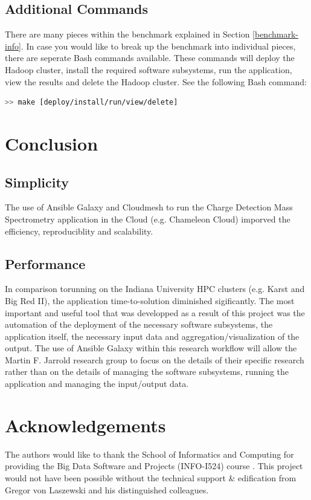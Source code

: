 \documentclass[9pt,twocolumn,twoside]{../../styles/osajnl}
\begin{document}
\subsection{Additional Commands} \label{other}
There are many pieces within the benchmark explained in Section
\ref{benchmark-info}. In case you would like to break up the benchmark
into individual pieces, there are seperate Bash commands
available. These commands will deploy the Hadoop cluster, install the
required software subsystems, run the application, view the results
and delete the Hadoop cluster.
\noindent See the following Bash command:
\begin{lstlisting}[language=bash]
  >> make [deploy/install/run/view/delete]
\end{lstlisting}

\section{Conclusion} \label{conclusion}
\subsection{Simplicity} \label{Simplicity}
The use of Ansible Galaxy and Cloudmesh to run the Charge Detection
Mass Spectrometry application in the Cloud (e.g. Chameleon Cloud)
imporved the efficiency, reproduciblity and scalability.
\subsection{Performance} \label{performance}
In comparison torunning on the Indiana University HPC clusters
(e.g. Karst and Big Red II), the application time-to-solution
diminished sigificantly. The most important and useful tool that was
developped as a result of this project was the automation of the
deployment of the necessary software subsystems, the application
itself, the necessary input data and aggregation/visualization of the
output. The use of Ansible Galaxy within this research workflow will
allow the Martin F. Jarrold research group to focus on the details of
their specific research rather than on the details of managing the
software subsystems, running the application and managing the
input/output data.

\section*{Acknowledgements}
The authors would like to thank the School of Informatics and
Computing for providing the Big Data Software and Projects (INFO-I524)
course \cite{www-i524}. This project would not have been possible
without the technical support \& edification from Gregor von Laszewski
and his distinguished colleagues.
\end{document}
